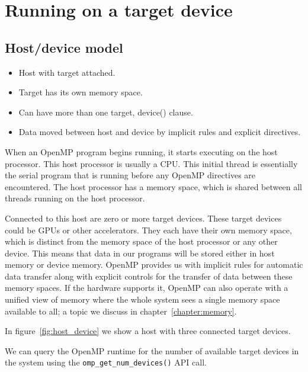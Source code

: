 
\chapter{Running on a target device}
\label{chapter:target}

\section{Host/device model}
\begin{itemize}
  \item Host with target attached.
  \item Target has its own memory space.
  \item Can have more than one target, device() clause.
  \item Data moved between host and device by implicit rules and explicit directives.
\end{itemize}

When an OpenMP program begins running, it starts executing on the host processor.
This host processor is usually a CPU.
This initial thread is essentially the serial program that is running before any OpenMP directives are encountered.
The host processor has a memory space, which is shared between all threads running on the host processor.

Connected to this host are zero or more target devices. These target devices could be GPUs or other accelerators.
They each have their own memory space, which is distinct from the memory space of the host processor or any other device.
This means that data in our programs will be stored either in host memory or device memory.
OpenMP provides us with implicit rules for automatic data transfer along with explicit controls for the transfer of data between these memory spaces.
If the hardware supports it, OpenMP can also operate with a unified view of memory where the whole system sees a single memory space available to all; a topic we discuss in chapter~\ref{chapter:memory}.

In figure~\ref{fig:host_device} we show a host with three connected target devices.

We can query the OpenMP runtime for the number of available target devices in the system using the \texttt{omp\_get\_num\_devices()} API call.


